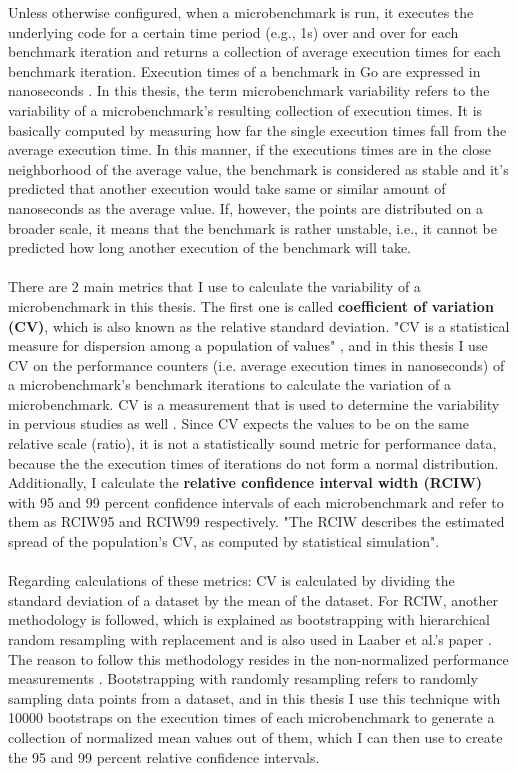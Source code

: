 \documentclass{seal_thesis}
\begin{document}
Unless otherwise configured, when a microbenchmark is run, it executes the underlying code for a certain time period (e.g., 1s) over and over for each benchmark iteration and returns a collection of average execution times for each benchmark iteration\cite{laaber2019software}. Execution times of a benchmark in Go are expressed in nanoseconds \cite{laaber2019software} \cite{costa2019}. In this thesis, the term microbenchmark variability refers to the variability of a microbenchmark's resulting collection of execution times. It is basically computed by measuring how far the single execution times fall from the average execution time. In this manner, if the executions times are in the close neighborhood of the average value, the benchmark is considered as stable and it's predicted that another execution would take same or similar amount of nanoseconds as the average value. If, however, the points are distributed on a broader scale, it means that the benchmark is rather unstable, i.e., it cannot be predicted how long another execution of the benchmark will take.\\
\\
There are 2 main metrics that I use to calculate the variability of a microbenchmark in this thesis. The first one is called \textbf{coefficient of variation (CV)}, which is also known as the relative standard deviation\cite{laaber2019software}. "CV is a statistical measure for dispersion among a population of values" \cite{laaber2019software}, and in this thesis I use CV on the performance counters (i.e. average execution times in nanoseconds) of a microbenchmark's benchmark iterations to calculate the variation of a microbenchmark. CV is a measurement that is used to determine the variability in pervious studies as well \cite{laaber2019software} \cite{Leitner:2016:PCS:2926746.2885497}. Since CV expects the values to be on the same relative scale (ratio), it is not a statistically sound metric for performance data, because the the execution times of iterations do not form a normal distribution. Additionally, I calculate the \textbf{relative confidence interval width (RCIW)} with 95 and 99 percent confidence intervals of each microbenchmark and refer to them as RCIW95 and RCIW99 respectively. "The RCIW describes the estimated spread of the population's CV, as computed by statistical simulation"\cite{laaber2019software}.\\
\\
Regarding calculations of these metrics: CV is calculated by dividing the standard deviation of a dataset by the mean of the dataset. For RCIW, another methodology is followed, which is explained as bootstrapping with hierarchical random resampling with replacement and is also used in Laaber et al.'s paper \cite{laaber2019software}\cite{davison_hinkley_1997}\cite{hierach_data_2010} . The reason to follow this methodology resides in the non-normalized performance measurements \cite{laaber2019software}. Bootstrapping with randomly resampling refers to randomly sampling data points from a dataset, and in this thesis I use this technique with 10000 bootstraps on the execution times of each microbenchmark to generate a collection of normalized mean values out of them, which I can then use to create the 95 and 99 percent relative confidence intervals.
\end{document}
